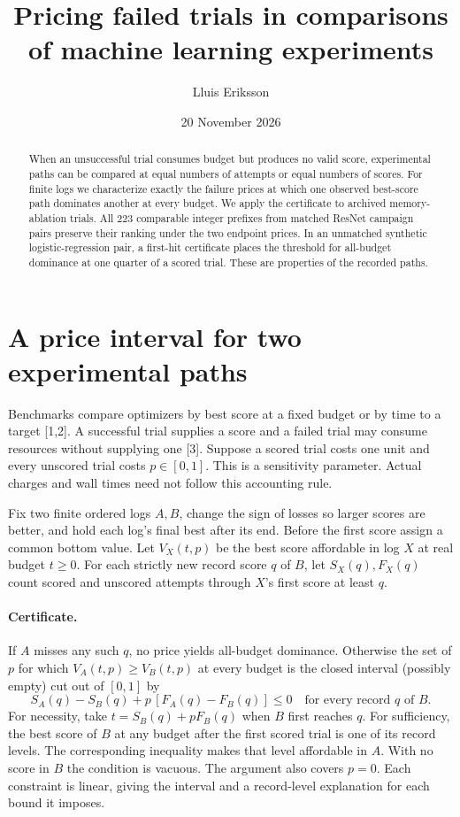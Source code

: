 \documentclass[11pt]{article}
\title{Pricing failed trials in comparisons of machine learning experiments}
\author{Lluis Eriksson}
\date{20 November 2026}
\begin{document}
\maketitle
\begin{abstract}
When an unsuccessful trial consumes budget but produces no valid score, experimental paths can be compared at equal numbers of attempts or equal numbers of scores. For finite logs we characterize exactly the failure prices at which one observed best-score path dominates another at every budget. We apply the certificate to archived memory-ablation trials. All 223 comparable integer prefixes from matched ResNet campaign pairs preserve their ranking under the two endpoint prices. In an unmatched synthetic logistic-regression pair, a first-hit certificate places the threshold for all-budget dominance at one quarter of a scored trial. These are properties of the recorded paths.
\end{abstract}
\section{A price interval for two experimental paths}
Benchmarks compare optimizers by best score at a fixed budget or by time to a target [1,2]. A successful trial supplies a score and a failed trial may consume resources without supplying one [3]. Suppose a scored trial costs one unit and every unscored trial costs $p\in[0,1]$. This is a sensitivity parameter. Actual charges and wall times need not follow this accounting rule.

Fix two finite ordered logs $A,B$, change the sign of losses so larger scores are better, and hold each log's final best after its end. Before the first score assign a common bottom value. Let $V_X(t,p)$ be the best score affordable in log $X$ at real budget $t\ge0$. For each strictly new record score $q$ of $B$, let $S_X(q),F_X(q)$ count scored and unscored attempts through $X$'s first score at least $q$.
\paragraph{Certificate.} If $A$ misses any such $q$, no price yields all-budget dominance. Otherwise the set of $p$ for which $V_A(t,p)\ge V_B(t,p)$ at every budget is the closed interval (possibly empty) cut out of $[0,1]$ by
\[
 S_A(q)-S_B(q)+p\,[F_A(q)-F_B(q)]\le0
 \quad\text{for every record }q\text{ of }B.
\]
For necessity, take $t=S_B(q)+pF_B(q)$ when $B$ first reaches $q$. For sufficiency, the best score of $B$ at any budget after the first scored trial is one of its record levels. The corresponding inequality makes that level affordable in $A$. With no score in $B$ the condition is vacuous. The argument also covers $p=0$. Each constraint is linear, giving the interval and a record-level explanation for each bound it imposes.
\end{document}
